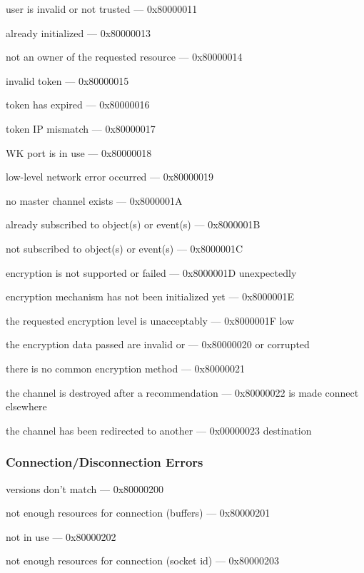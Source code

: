 \documentclass[titlepage,oneside]{book}
\begin{document}
user is invalid or not trusted                    --- 0x80000011

already initialized                               --- 0x80000013

not an owner of the requested resource            --- 0x80000014

invalid token                                     --- 0x80000015

token has expired                                 --- 0x80000016

token IP mismatch                                 --- 0x80000017

WK port is in use                                 --- 0x80000018

low-level network error occurred                  --- 0x80000019

no master channel exists                          --- 0x8000001A

already subscribed to object(s) or event(s)       --- 0x8000001B

not subscribed to object(s) or event(s)           --- 0x8000001C

encryption is not supported or failed             --- 0x8000001D
unexpectedly

encryption mechanism has not been initialized yet --- 0x8000001E

the requested encryption level is unacceptably    --- 0x8000001F
low

the encryption data passed are invalid or         --- 0x80000020
or corrupted

there is no common encryption method              --- 0x80000021

the channel is destroyed after a recommendation   --- 0x80000022
is made connect elsewhere

the channel has been redirected to another        --- 0x00000023
destination

\subsubsection{Connection/Disconnection Errors}

versions don't match                              --- 0x80000200

not enough resources for connection (buffers)     --- 0x80000201

not in use                                        --- 0x80000202

not enough resources for connection (socket id)   --- 0x80000203
\end{document}
